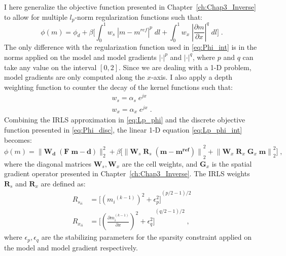 I here generalize the objective function presented in Chapter~\ref{ch:Chap3_Inverse} to allow for multiple $l_p$-norm regularization functions such that:
\begin{equation} \label{eq:Lp_phi_int}
\phi(m) =  \phi_d + \beta \Big [ \int_0^1 w_s \; {\left|m - m^{ref}\right|^p} \; dl + \int_0^1 w_x\; {\left|\frac{\partial m}{\partial x}\right|^{q}} \;dl \Big ]\;.
\end{equation}
The only difference with the regularization function used in \ref{eq:Phi_int} is in the norms applied on the model and model gradients ${|\cdot|}^p$ and ${|\cdot|}^q$, where $p$ and $q$ can take any value on the interval $[0, 2]$.
Since we are dealing with a 1-D problem, model gradients are only computed along the $x$-axis.
I also apply a depth weighting function to counter the decay of the kernel functions such that:
\begin{equation}\label{DepthWeight}
\begin{split}
w_s = \alpha_s\; e^{jx}\\
w_x = \alpha_x\; e^{jx}\;.
\end{split}
\end{equation}
Combining the IRLS approximation in \eqref{eq:Lp_phi} and the discrete objective function presented in \ref{eq:Phi_disc}, the linear 1-D equation \ref{eq:Lp_phi_int} becomes:
 \begin{equation} \label{eq:Lp_phi_1D}
\phi(m) =  \|\mathbf{W_\text{d} \;( F\;m - d)}\|_2^{2} + \beta \Big [ {\| \mathbf{W}_s \; \mathbf{R}_s\; ( \mathbf{m - m^{ref}})\|}^2_2  + {\|   \mathbf{W}_x  \; \mathbf{R}_x\; \mathbf{G}_x \; \mathbf{m}\|}^2_2  \Big ]\;,
\end{equation}
where the diagonal matrices $\mathbf{W}_s,\mathbf{W}_x$ are the cell weights, and $\mathbf{G}_x$ is the spatial gradient operator presented in Chapter~\ref{ch:Chap3_Inverse}.
The IRLS weights $\mathbf{R}_s$ and $\mathbf{R}_x$ are defined as:
\begin{equation}\label{eq:Rs_Rx}
\begin{split}
	{R}_{s_{ii}}  &= {\Big[ {({m_i}^{(k-1)})}^{2} + \epsilon_p^2 \Big]}^{(p/2 - 1)/2} \\
	{R}_{x_{ii}}  &= {\Big[ {\left ({\frac{\partial m_i^{(k-1)} }{\partial x}}\right)}^{2} + \epsilon_q^2 \Big]}^{(q/2 - 1)/2}  \;,
\end{split}
\end{equation}
where $\epsilon_p, \epsilon_q$ are the stabilizing parameters for the sparsity constraint applied on the model and model gradient respectively.

